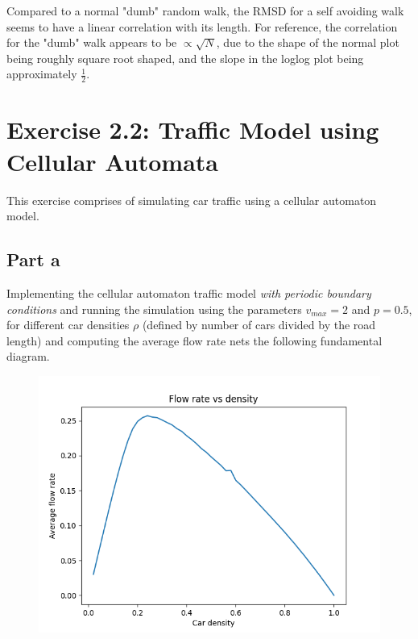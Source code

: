 \documentclass[a4paper,12pt]{article}
\begin{document}
Compared to a normal "dumb" random walk, the RMSD for a self avoiding walk seems to have a linear correlation with
its length. For reference, the correlation for the "dumb" walk appears to be $\propto \sqrt{N}$, due to the shape
of the normal plot being roughly square root shaped, and the slope in the loglog plot being approximately
$\frac{1}{2}$.

\pagebreak

\section*{Exercise 2.2: Traffic Model using Cellular Automata}

This exercise comprises of simulating car traffic using a cellular automaton model.

\subsection*{Part a}

Implementing the cellular automaton traffic model \emph{with periodic boundary conditions} and running the simulation
using the parameters $v_{max} = 2$ and $p = 0.5$, for different car densities $\rho$ (defined by number of cars
divided by the road length) and computing the average flow rate nets the following fundamental diagram.

\begin{figure}[!ht]
  \centering
  \includegraphics[scale=0.48]{img/2_2a_fr_density.png}
\end{figure}
\end{document}
